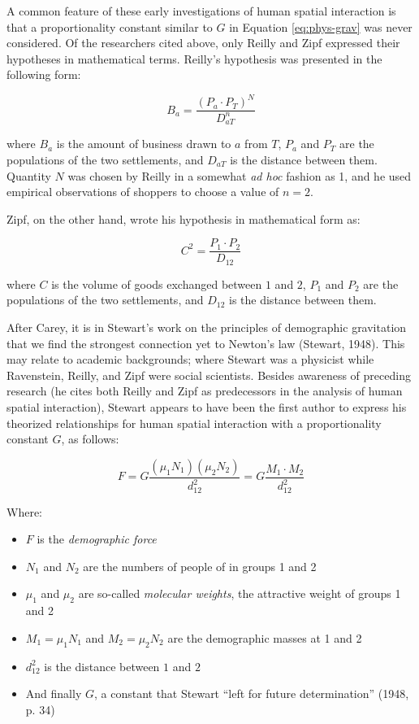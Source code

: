 \documentclass[
11pt, %
oneside, %
english, %
singlespacing, %
]{macthesis} %
\def\tightlist{}
\begin{document}
A common feature of these early investigations of human spatial interaction is that a proportionality constant similar to \(G\) in Equation \ref{eq:phys-grav} was never considered. Of the researchers cited above, only Reilly and Zipf expressed their hypotheses in mathematical terms. Reilly's hypothesis was presented in the following form:

\begin{equation}
\label{eq:reilly}
B_a = \frac{(P_a\cdot P_T)^N}{D_{aT}^n}
\end{equation} 

\noindent where \(B_a\) is the amount of business drawn to \(a\) from \(T\), \(P_a\) and \(P_T\) are the populations of the two settlements, and \(D_{aT}\) is the distance between them. Quantity \(N\) was chosen by Reilly in a somewhat \emph{ad hoc} fashion as 1, and he used empirical observations of shoppers to choose a value of \(n = 2\).

Zipf, on the other hand, wrote his hypothesis in mathematical form as:

\begin{equation}
\label{eq:zipf}
C^2 = \frac{P_1\cdot P_2}{D_{12}}
\end{equation} 

\noindent where \(C\) is the volume of goods exchanged between \(1\) and \(2\), \(P_1\) and \(P_2\) are the populations of the two settlements, and \(D_{12}\) is the distance between them.

After Carey, it is in Stewart's work on the principles of demographic gravitation that we find the strongest connection yet to Newton's law (Stewart, 1948). This may relate to academic backgrounds; where Stewart was a physicist while Ravenstein, Reilly, and Zipf were social scientists. Besides awareness of preceding research (he cites both Reilly and Zipf as predecessors in the analysis of human spatial interaction), Stewart appears to have been the first author to express his theorized relationships for human spatial interaction with a proportionality constant \(G\), as follows:

\begin{equation}
\label{eq:stewart-force}
F = G\frac{(\mu_1N_1)(\mu_2N_2)}{d_{12}^2} = G\frac{M_1\cdot M_2}{d_{12}^2} 
\end{equation} 

\noindent Where:

\begin{itemize}
\tightlist
\item
  \(F\) is the \emph{demographic force}
\item
  \(N_1\) and \(N_2\) are the numbers of people of in groups 1 and 2
\item
  \(\mu_1\) and \(\mu_2\) are so-called \emph{molecular weights}, the attractive weight of groups 1 and 2
\item
  \(M_1 = \mu_1N_1\) and \(M_2 = \mu_2N_2\) are the demographic masses at 1 and 2
\item
  \(d_{12}^2\) is the distance between \(1\) and \(2\)
\item
  And finally \(G\), a constant that Stewart ``left for future determination'' (1948, p. 34)
\end{itemize}
\end{document}
